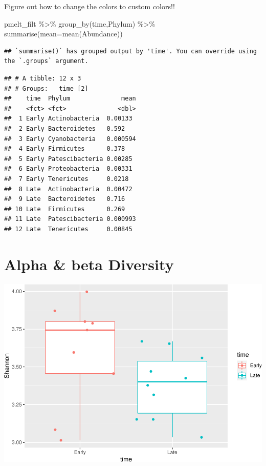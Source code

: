 \documentclass[
]{book}
\newenvironment{Shaded}{\begin{snugshade}}{\end{snugshade}}
\newcommand{\AttributeTok}[1]{\textcolor[rgb]{0.77,0.63,0.00}{#1}}
\newcommand{\FunctionTok}[1]{\textcolor[rgb]{0.00,0.00,0.00}{#1}}
\newcommand{\NormalTok}[1]{#1}
\newcommand{\SpecialCharTok}[1]{\textcolor[rgb]{0.00,0.00,0.00}{#1}}
\begin{document}
Figure out how to change the colors to custom colors!!

\begin{Shaded}
\begin{Highlighting}[]
\NormalTok{pmelt\_filt }\SpecialCharTok{\%\textgreater{}\%} \FunctionTok{group\_by}\NormalTok{(time,Phylum) }\SpecialCharTok{\%\textgreater{}\%} \FunctionTok{summarise}\NormalTok{(}\AttributeTok{mean=}\FunctionTok{mean}\NormalTok{(Abundance))}
\end{Highlighting}
\end{Shaded}

\begin{verbatim}
## `summarise()` has grouped output by 'time'. You can override using the `.groups` argument.
\end{verbatim}

\begin{verbatim}
## # A tibble: 12 x 3
## # Groups:   time [2]
##    time  Phylum              mean
##    <fct> <fct>              <dbl>
##  1 Early Actinobacteria  0.00133 
##  2 Early Bacteroidetes   0.592   
##  3 Early Cyanobacteria   0.000594
##  4 Early Firmicutes      0.378   
##  5 Early Patescibacteria 0.00285 
##  6 Early Proteobacteria  0.00331 
##  7 Early Tenericutes     0.0218  
##  8 Late  Actinobacteria  0.00472 
##  9 Late  Bacteroidetes   0.716   
## 10 Late  Firmicutes      0.269   
## 11 Late  Patescibacteria 0.000993
## 12 Late  Tenericutes     0.00845
\end{verbatim}

\hypertarget{alpha-beta-diversity}{%
\section{Alpha \& beta Diversity}\label{alpha-beta-diversity}}

\includegraphics{16sworkshop_files/figure-latex/alpha diversit-1.pdf}
\end{document}
